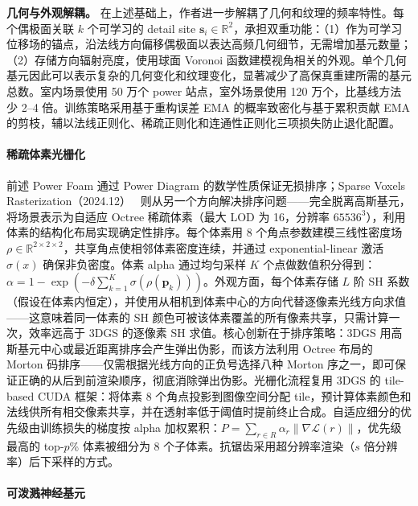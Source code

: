 \textbf{几何与外观解耦。}
在上述基础上，作者进一步解耦了几何和纹理的频率特性。每个偶极面关联 $k$ 个可学习的 detail site $\mathbf{s}_i \in \mathbb{R}^2$，承担双重功能：（1）作为可学习位移场的锚点，沿法线方向偏移偶极面以表达高频几何细节，无需增加基元数量；（2）存储方向辐射亮度，使用球面 Voronoi 函数建模视角相关的外观。单个几何基元因此可以表示复杂的几何变化和纹理变化，显著减少了高保真重建所需的基元总数。室内场景使用 50 万个 power 站点，室外场景使用 120 万个，比基线方法少 2--4 倍。训练策略采用基于重构误差 EMA 的概率致密化与基于累积贡献 EMA 的剪枝，辅以法线正则化、稀疏正则化和连通性正则化三项损失防止退化配置。

\paragraph{稀疏体素光栅化}

前述 Power Foam 通过 Power Diagram 的数学性质保证无损排序；Sparse Voxels Rasterization（2024.12）~\cite{2412_04459} 则从另一个方向解决排序问题——完全脱离高斯基元，将场景表示为自适应 Octree 稀疏体素（最大 LOD 为 16，分辨率 $65536^3$），利用体素的结构化布局实现确定性排序。每个体素用 8 个角点参数建模三线性密度场 $\rho \in \mathbb{R}^{2 \times 2 \times 2}$，共享角点使相邻体素密度连续，并通过 exponential-linear 激活 $\sigma(x)$ 确保非负密度。体素 alpha 通过均匀采样 $K$ 个点做数值积分得到：$\alpha = 1 - \exp(-\delta \sum_{k=1}^{K} \sigma(\rho(\mathbf{p}_k)))$。外观方面，每个体素存储 $L$ 阶 SH 系数（假设在体素内恒定），并使用从相机到体素中心的方向代替逐像素光线方向求值——这意味着同一体素的 SH 颜色可被该体素覆盖的所有像素共享，只需计算一次，效率远高于 3DGS 的逐像素 SH 求值。核心创新在于排序策略：3DGS 用高斯基元中心或最近距离排序会产生弹出伪影，而该方法利用 Octree 布局的 Morton 码排序——仅需根据光线方向的正负号选择八种 Morton 序之一，即可保证正确的从后到前渲染顺序，彻底消除弹出伪影。光栅化流程复用 3DGS 的 tile-based CUDA 框架：将体素 8 个角点投影到图像空间分配 tile，预计算体素颜色和法线供所有相交像素共享，并在透射率低于阈值时提前终止合成。自适应细分的优先级由训练损失的梯度按 alpha 加权累积：$P = \sum_{r \in R} \alpha_r \|\nabla \mathcal{L}(r)\|$，优先级最高的 top-$p$\% 体素被细分为 8 个子体素。抗锯齿采用超分辨率渲染（$s$ 倍分辨率）后下采样的方式。

\paragraph{可泼溅神经基元}

